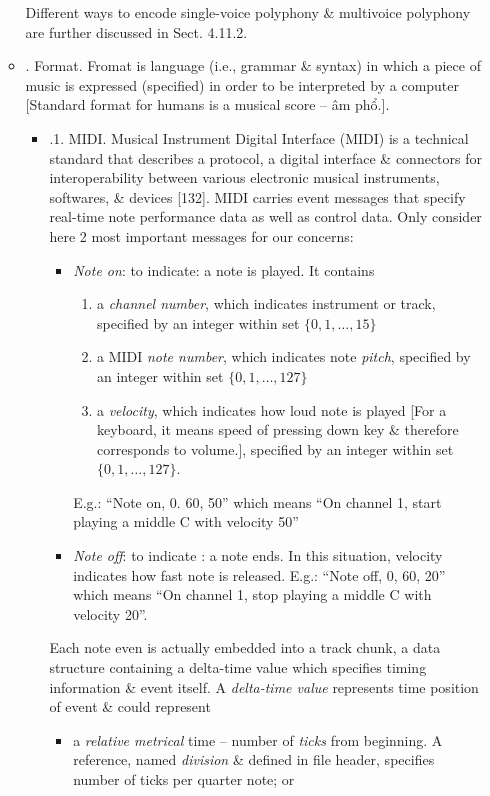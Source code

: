 \documentclass{article}
\begin{document}
\begin{itemize}
\begin{itemize}
		Different ways to encode single-voice polyphony \& multivoice polyphony are further discussed in Sect. 4.11.2.
		\item {. Format.} Fromat is language (i.e., grammar \& syntax) in which a piece of music is expressed (specified) in order to be interpreted by a computer [Standard format for humans is a musical score -- âm phổ.].
		\begin{itemize}
			\item {.1. MIDI.} Musical Instrument Digital Interface (MIDI) is a technical standard that describes a protocol, a digital interface \& connectors for interoperability between various electronic musical instruments, softwares, \& devices [132]. MIDI carries event messages that specify real-time note performance data as well as control data. Only consider here 2 most important messages for our concerns:
			\begin{itemize}
				\item {\it Note on}: to indicate: a note is played. It contains
				\begin{enumerate}
					\item a {\it channel number}, which indicates instrument or track, specified by an integer within set $\{0,1,\ldots,15\}$
					\item a MIDI {\it note number}, which indicates note {\it pitch}, specified by an integer within set $\{0,1,\ldots,127\}$
					\item a {\it velocity}, which indicates how loud note is played [For a keyboard, it means speed of pressing down key \& therefore corresponds to volume.], specified by an integer within set $\{0,1,\ldots,127\}$.
				\end{enumerate}
				E.g.: ``Note on, 0. 60, 50'' which means ``On channel 1, start playing a middle C with velocity 50''
				\item {\it Note off}: to indicate : a note ends. In this situation, velocity indicates how fast note is released. E.g.: ``Note off, 0, 60, 20'' which means ``On channel 1, stop playing a middle C with velocity 20''.
			\end{itemize}
			Each note even is actually embedded into a track chunk, a data structure containing a delta-time value which specifies timing information \& event itself. A {\it delta-time value} represents time position of event \& could represent
			\begin{itemize}
				\item a {\it relative metrical} time -- number of {\it ticks} from beginning. A reference, named {\it division} \& defined in file header, specifies number of ticks per quarter note; or

\end{itemize}
\end{itemize}
\end{itemize}
\end{itemize}
\end{document}
